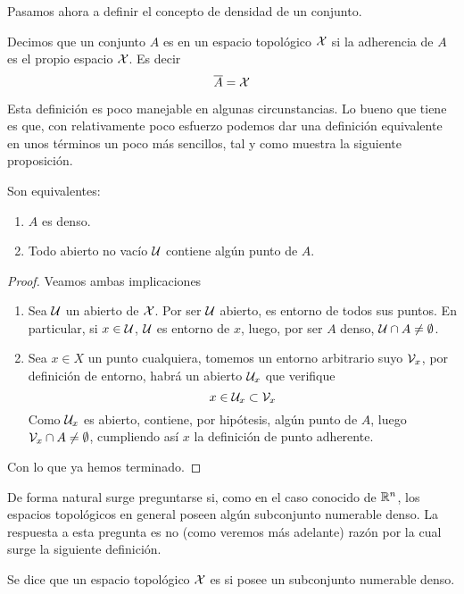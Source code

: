 Pasamos ahora a definir el concepto de densidad de un conjunto.
\begin{defi}
	\label{etop_def_denso}
	Decimos que un conjunto $A$ es  en un espacio topológico $\mathcal{X}$ si la adherencia de $A$ es el propio espacio $\mathcal{X}$. Es decir
	\begin{equation*}
	\overline{A}=\mathcal{X}
	\end{equation*}
\end{defi}
Esta definición es poco manejable en algunas circunstancias. Lo bueno que tiene es que, con relativamente poco esfuerzo podemos dar una definición equivalente en unos términos un poco más sencillos, tal y como muestra la siguiente proposición.
\begin{prop}
	Son equivalentes:
	\begin{enumerate}
		\item $A$ es denso.
		\item Todo abierto no vacío $\mathcal{U}$ contiene algún punto de $A$.
	\end{enumerate}
\end{prop}
\begin{proof} Veamos ambas implicaciones
	\begin{enumerate}
		\item[\bra] Sea $\mathcal{U}$ un abierto de $\mathcal{X}$. Por ser $\mathcal{U}$ abierto, es entorno de todos sus puntos. En particular, si $x\in\mathcal{U}$, $\mathcal{U}$ es entorno de $x$, luego, por ser $A$ denso, $\mathcal{U}\cap A\not= \emptyset$.
		\item[\bla] Sea $x\in X$ un punto cualquiera, tomemos un entorno arbitrario suyo $\mathcal{V}_x$, por definición de entorno, habrá un abierto $\mathcal{U}_x$ que verifique
		\begin{equation*}
		x\in\mathcal{U}_x\subset\mathcal{V}_x
		\end{equation*}
		Como $\mathcal{U}_x$ es abierto, contiene, por hipótesis, algún punto de $A$, luego $\mathcal{V}_x\cap A\not=\emptyset$, cumpliendo así $x$ la definición de punto adherente.
	\end{enumerate}
	Con lo que ya hemos terminado.
\end{proof}
De forma natural surge preguntarse si, como en el caso conocido de $\mathbb{R}^n$, los espacios topológicos en general poseen algún subconjunto numerable denso. La respuesta a esta pregunta es no (como veremos más adelante) razón por la cual surge la siguiente definición.
\begin{defi}
	Se dice que un espacio topológico $\mathcal{X}$ es  si posee un subconjunto numerable denso.
\end{defi}


